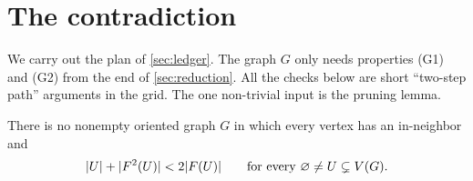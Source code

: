 \section{The contradiction}\label{sec:contradiction}

\begin{idea}
We carry out the plan of \cref{sec:ledger}. The graph $G$ only needs
properties (G1) and (G2) from the end of \cref{sec:reduction}. All the
checks below are short ``two-step path'' arguments in the grid. The one
non-trivial input is the pruning lemma.
\end{idea}

\begin{proposition}\label{prop:no-concave}
There is no nonempty oriented graph $G$ in which every vertex has an
in-neighbor and
\begin{equation}\label{eq:concave-again}
 \lvert U\rvert+\lvert F^2(U)\rvert<2\lvert F(U)\rvert\qquad\text{for every }\varnothing\ne U\subsetneq V(G).
\end{equation}
\end{proposition}

